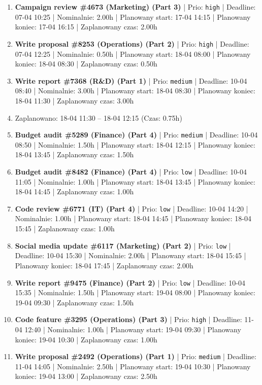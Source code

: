 {\begin{enumerate}
  \item [\textbf{14625}] \textbf{Campaign review \#4673 (Marketing) (Part 3)} | Prio: \texttt{high} | Deadline: 07-04 10:25 | Nominalnie: 2.00h | Planowany start: 17-04 14:15 | Planowany koniec: 17-04 16:15 | Zaplanowany czas: 2.00h
  \item [\textbf{14614}] \textbf{Write proposal \#8253 (Operations) (Part 2)} | Prio: \texttt{high} | Deadline: 07-04 12:25 | Nominalnie: 0.50h | Planowany start: 18-04 08:00 | Planowany koniec: 18-04 08:30 | Zaplanowany czas: 0.50h
  \item [\textbf{14633}] \textbf{Write report \#7368 (R\&D) (Part 1)} | Prio: \texttt{medium} | Deadline: 10-04 08:40 | Nominalnie: 3.00h | Planowany start: 18-04 08:30 | Planowany koniec: 18-04 11:30 | Zaplanowany czas: 3.00h
  \item [\textbf{PRZERWA}] Zaplanowano: 18-04 11:30 -- 18-04 12:15 (Czas: 0.75h)
  \item [\textbf{14630}] \textbf{Budget audit \#5289 (Finance) (Part 4)} | Prio: \texttt{medium} | Deadline: 10-04 08:50 | Nominalnie: 1.50h | Planowany start: 18-04 12:15 | Planowany koniec: 18-04 13:45 | Zaplanowany czas: 1.50h
  \item [\textbf{14694}] \textbf{Budget audit \#8482 (Finance) (Part 4)} | Prio: \texttt{low} | Deadline: 10-04 11:05 | Nominalnie: 1.00h | Planowany start: 18-04 13:45 | Planowany koniec: 18-04 14:45 | Zaplanowany czas: 1.00h
  \item [\textbf{14681}] \textbf{Code review \#6771 (IT) (Part 4)} | Prio: \texttt{low} | Deadline: 10-04 14:20 | Nominalnie: 1.00h | Planowany start: 18-04 14:45 | Planowany koniec: 18-04 15:45 | Zaplanowany czas: 1.00h
  \item [\textbf{14700}] \textbf{Social media update \#6117 (Marketing) (Part 2)} | Prio: \texttt{low} | Deadline: 10-04 15:30 | Nominalnie: 2.00h | Planowany start: 18-04 15:45 | Planowany koniec: 18-04 17:45 | Zaplanowany czas: 2.00h
  \item [\textbf{14685}] \textbf{Write report \#9475 (Finance) (Part 2)} | Prio: \texttt{low} | Deadline: 10-04 15:35 | Nominalnie: 1.50h | Planowany start: 19-04 08:00 | Planowany koniec: 19-04 09:30 | Zaplanowany czas: 1.50h
  \item [\textbf{14608}] \textbf{Code feature \#3295 (Operations) (Part 3)} | Prio: \texttt{high} | Deadline: 11-04 12:40 | Nominalnie: 1.00h | Planowany start: 19-04 09:30 | Planowany koniec: 19-04 10:30 | Zaplanowany czas: 1.00h
  \item [\textbf{14668}] \textbf{Write proposal \#2492 (Operations) (Part 1)} | Prio: \texttt{medium} | Deadline: 11-04 14:05 | Nominalnie: 2.50h | Planowany start: 19-04 10:30 | Planowany koniec: 19-04 13:00 | Zaplanowany czas: 2.50h

\end{enumerate}}
